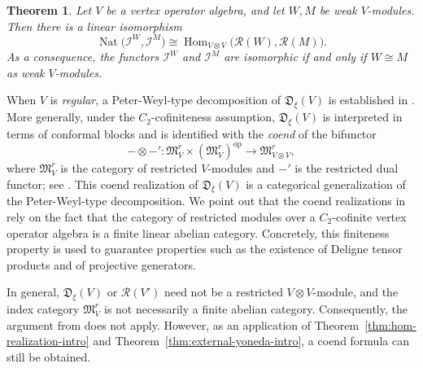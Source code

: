\documentclass[12pt, english]{article}
\numberwithin{equation}{section}
\DeclareMathOperator{\opp}{op}
\theoremstyle{plain}
\newtheorem{mainthm}{Theorem}
\theoremstyle{definition}
\theoremstyle{remark}
\begin{document}
	
	\begin{mainthm} \label{Yoneda-lem-intro}
		Let $V$ be a vertex operator algebra, and let $W, M$ be weak $V$-modules. Then there is a linear isomorphism
		\begin{equation*}
			\operatorname{Nat}\bigl( \mathcal{I}^W, \mathcal I^M \bigr) \cong \operatorname{Hom}_{V \otimes V}\bigl( \mathcal R(W), \mathcal R(M) \bigr).
		\end{equation*}
		As a consequence, the functors $\mathcal I^W$ and $\mathcal I^M$ are isomorphic if and only if $W\cong M$ as weak $V$-modules.
	\end{mainthm}
	
	
	
	
	\begin{center}
		\textbf{\textasteriskcentered\qquad\textasteriskcentered\qquad\textasteriskcentered}
	\end{center}
	
	When $V$ is \emph{regular}, a Peter-Weyl-type decomposition of $\mathfrak{D}_\xi(V)$ is established in \cite{Li02,Li02b}. More generally, under the $C_2$-cofiniteness assumption, $\mathfrak{D}_\xi(V)$ is interpreted in terms of conformal blocks and is identified with the \emph{coend} of the bifunctor
	\[
	-\otimes -' \colon \mathfrak{M}^r_V \times (\mathfrak{M}^r_V)^{\opp} \to \mathfrak{M}^r_{V \otimes V},
	\]
	where $\mathfrak{M}^r_V$ is the category of restricted $V$-modules and $-'$ is the restricted dual functor; see \cite{GZ25,GZ26}. This coend realization of $\mathfrak{D}_\xi(V)$ is a categorical generalization of the Peter-Weyl-type decomposition. We point out that the coend realizations in \cite{GZ25,GZ26} rely on the fact that the category of restricted modules over a $C_2$-cofinite vertex operator algebra is a finite linear abelian category.
	Concretely, this finiteness property is used to guarantee properties such as the existence of Deligne tensor products and of projective generators.
	
	
	
	In general, $\mathfrak{D}_\xi(V)$ or $\mathcal{R}(V')$ need not be a restricted $V\otimes V$-module, and the index category $\mathfrak{M}^r_V$ is not necessarily a finite abelian category. 
	Consequently, the argument from \cite{GZ25,GZ26} does not apply. 
	However, as an application of Theorem~\ref{thm:hom-realization-intro} and Theorem~\ref{thm:external-yoneda-intro}, a coend formula can still be obtained.  
	
\end{document}
